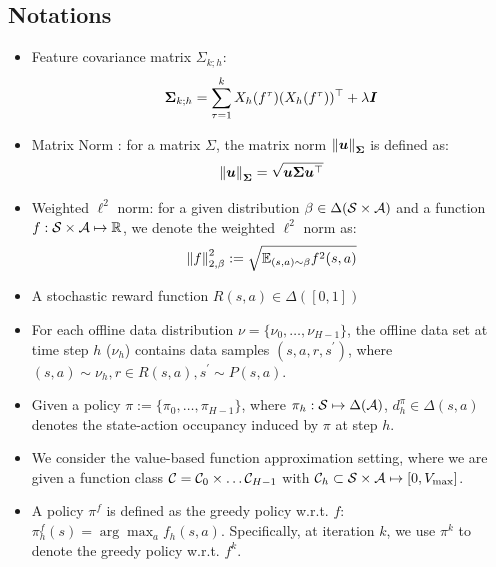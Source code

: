 \subsection{Notations}
\label{appendix:notations}
\vspace{-0.2cm}
\begin{itemize}
    \item Feature covariance matrix $\Sigma_{k;h}$: 
    \begin{equation}
    \label{eq:covariance-matrix}
        \boldsymbol \Sigma_{k;h}=\sum_{\tau=1}^kX_h(f^\tau)(X_h(f^\tau))^\top+\lambda \boldsymbol I
    \end{equation}
    \item Matrix Norm \citet{zanette2021provable}: for a matrix $\Sigma$, the matrix norm $\left\| \boldsymbol u \right\|_{\boldsymbol \Sigma}$ is defined as:
    \begin{equation}
        \left\| \boldsymbol u \right\|_{\boldsymbol \Sigma}=\sqrt{\boldsymbol u\boldsymbol \Sigma \boldsymbol u^\top}
    \end{equation}
    \item Weighted $\ell^2$ norm: for a given distribution $\beta\in\Delta(\mathcal S\times \mathcal A)$ and a function $f:\mathcal S\times \mathcal A\mapsto \mathbb R$, we denote the weighted $\ell^2$ norm as:
    \begin{equation}
        \left\| f \right\|_{2,\beta}^2:=\sqrt{\mathbb E_{(s,a)\sim \beta}f^2(s,a)}
    \end{equation}
    \item A stochastic reward function $R(s,a)\in \Delta([0,1])$
    \item For each offline data distribution $\nu = \{\nu_0,\dots,\nu_{H-1}\}$, the offline data set at time step $h$ ($\nu_h$) contains data samples $(s,a,r,s^\prime)$, where $(s,a)\sim\nu_h,r\in R(s,a),s^\prime\sim P(s,a)$.
    \item Given a policy $\pi:=\{\pi_0,\dots,\pi_{H-1}\}$, where $\pi_h:\mathcal S\mapsto \Delta (\mathcal A)$, $d^\pi_h\in\Delta(s,a)$ denotes the state-action occupancy induced by $\pi$ at step $h$.
    \item We consider the value-based function approximation setting, where we are given a function class $\mathcal C=\mathcal C_0\times\dots\mathcal C_{H-1}$ with $\mathcal C_{h}\subset\mathcal S\times \mathcal A\mapsto[0, V_{\max}]$.
    \item A policy $\pi^f$ is defined as the greedy policy w.r.t. $f$: $\pi_h^f(s)=\arg\max_af_h(s,a)$. Specifically, at iteration $k$, we use $\pi^k$ to denote the greedy policy w.r.t. $f^k$.
\end{itemize}


